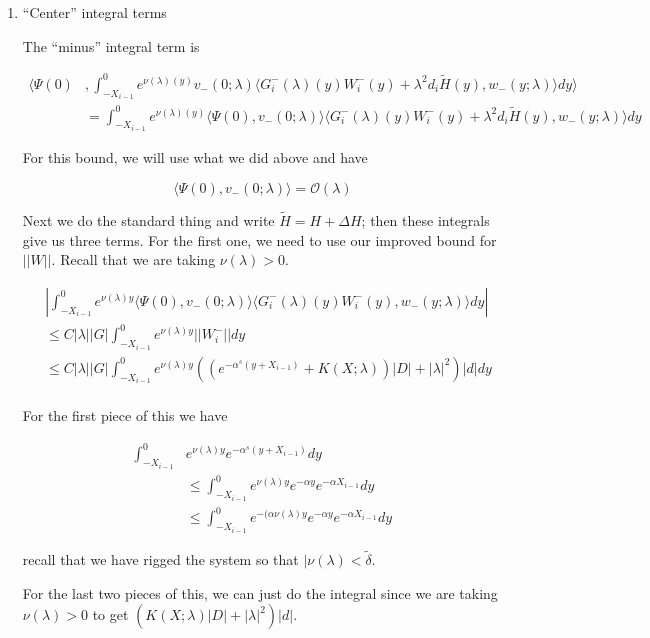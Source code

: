 \documentclass[12pt]{article}
\begin{document}
\begin{enumerate}
\begin{enumerate}[(i)]
\end{enumerate}

\item ``Center'' integral terms

The ``minus'' integral term is

\begin{align*}
\langle \Psi(0) &, \int_{-X_{i-1}}^0
e^{\nu(\lambda)(y)} v_-(0; \lambda) \langle G_i^-(\lambda)(y)W_i^-(y) + \lambda^2 d_i \tilde{H}(y), w_-(y; \lambda) \rangle dy \rangle \\
&= \int_{-X_{i-1}}^0
e^{\nu(\lambda)(y)} \langle \Psi(0), v_-(0; \lambda) \rangle \langle G_i^-(\lambda)(y)W_i^-(y) + \lambda^2 d_i \tilde{H}(y), w_-(y; \lambda) \rangle dy 
\end{align*}

For this bound, we will use what we did above and have

\[
\langle \Psi(0), v_-(0; \lambda) \rangle = \mathcal{O}(\lambda)
\]

Next we do the standard thing and write $\tilde{H} = H + \Delta H$; then these integrals give us three terms. For the first one, we need to use our improved bound for $||W||$. Recall that we are taking $\nu(\lambda) > 0$.

\begin{align*}
&\left| \int_{-X_{i-1}}^0
e^{\nu(\lambda)y} \langle \Psi(0), v_-(0; \lambda) \rangle \langle G_i^-(\lambda)(y)W_i^-(y), w_-(y; \lambda) \rangle dy \right| \\
&\leq C |\lambda| |G| \int_{-X_{i-1}}^0 e^{\nu(\lambda)y} ||W_i^-|| dy \\
&\leq C |\lambda| |G| \int_{-X_{i-1}}^0 e^{\nu(\lambda)y} ( (e^{-\alpha^s(y + X_{i-1})} + K(X; \lambda))|D| + |\lambda|^2 )|d| dy \\
\end{align*}

For the first piece of this we have

\begin{align*}
\int_{-X_{i-1}}^0 &e^{\nu(\lambda)y} e^{-\alpha^s(y + X_{i-1})}dy \\
&\leq \int_{-X_{i-1}}^0 e^{\nu(\lambda)y} e^{-\alpha y} e^{-\alpha X_{i-1}}dy \\
&\leq \int_{-X_{i-1}}^0 e^{-(\alpha \nu(\lambda)y} e^{-\alpha y} e^{-\alpha X_{i-1}}dy
\end{align*}

recall that we have rigged the system so that $|\nu(\lambda) < \tilde{\delta}$. 

For the last two pieces of this, we can just do the integral since we are taking $\nu(\lambda) > 0$ to get $(K(X; \lambda)|D| + |\lambda|^2 )|d|$.\\


\end{enumerate}
\end{document}
